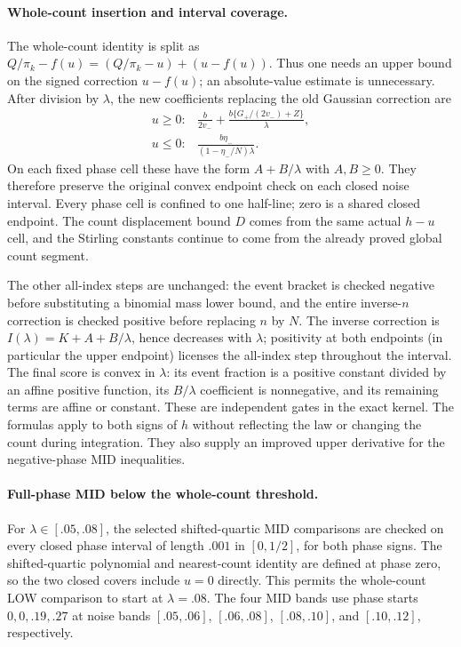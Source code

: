 \paragraph{Whole-count insertion and interval coverage.}
The whole-count identity is split as
$Q/\pi_k-f(u)=(Q/\pi_k-u)+(u-f(u))$.
Thus one needs an upper bound on the signed correction $u-f(u)$;
an absolute-value estimate is unnecessary. After division by $\lambda$,
the new coefficients replacing the old Gaussian correction are
\[
 \begin{array}{ll}
 u\ge0:&\displaystyle
 \frac b{2v_-}+\frac{b\{G_+/(2v_-)+Z\}}\lambda,\\[6pt]
 u\le0:&\displaystyle
 \frac{b\eta_-}{(1-\eta_-/N)\lambda}.
 \end{array}
\]
On each fixed phase cell these have the form $A+B/\lambda$ with
$A,B\ge0$. They therefore preserve the original convex endpoint check on
each closed noise interval. Every phase cell is confined to one half-line;
zero is a shared closed endpoint. The count displacement bound $D$ comes
from the same actual $h-u$ cell, and the Stirling constants continue to
come from the already proved global count segment.

The other all-index steps are unchanged: the event bracket is checked
negative before substituting a binomial mass lower bound, and the entire
inverse-$n$ correction is checked positive before replacing $n$ by $N$.
The inverse correction is $I(\lambda)=K+A+B/\lambda$, hence decreases with $\lambda$; positivity at both endpoints (in particular the upper endpoint) licenses the all-index step throughout the interval. The final score is convex in $\lambda$: its event fraction is a positive constant divided by an affine positive function, its $B/\lambda$ coefficient is nonnegative, and its remaining terms are affine or constant. These are independent gates in the exact kernel. The formulas apply to
both signs of $h$ without reflecting the law or changing the count during
integration. They also supply an improved upper derivative for the
negative-phase MID inequalities.
\paragraph{Full-phase MID below the whole-count threshold.}
For $\lambda\in[.05,.08]$, the selected shifted-quartic MID comparisons
are checked on every closed phase interval of length $.001$ in
$[0,1/2]$, for both phase signs. The shifted-quartic polynomial and
nearest-count identity are defined at phase zero, so the two closed covers
include $u=0$ directly. This permits the whole-count LOW comparison to
start at $\lambda=.08$. The four MID bands use phase starts
$0,0,.19,.27$ at noise bands $[.05,.06]$, $[.06,.08]$,
$[.08,.10]$, and $[.10,.12]$, respectively.




